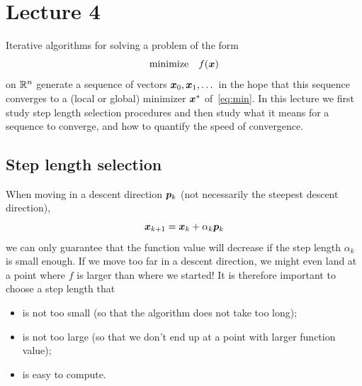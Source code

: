 %
%
% 


\chapter*{Lecture 4}
\setcounter{chapter}{4}
\setcounter{section}{0}
\setcounter{equation}{0}
\setcounter{theorem}{0}


Iterative algorithms for solving a problem of the form
\begin{equation}\label{eq:min}
 \text{minimize}\quad f(\bm{x})
\end{equation}
on $\mathbb{R}^n$ generate a sequence of vectors $\bm{x}_0,\bm{x}_1,\dots$ in the hope that this sequence converges to a (local or global) minimizer $\bm{x}^*$ of~\eqref{eq:min}. In this lecture we first study step length selection procedures and then study what it means for a sequence to converge, and how to quantify the speed of convergence.

\section{Step length selection}\label{sec:steplength}
When moving in a descent direction $\bm{p}_k$ (not necessarily the steepest descent direction), 
\begin{equation*}
  \bm{x}_{k+1} = \bm{x}_k+\alpha_k \bm{p}_k
\end{equation*}
we can only guarantee that the function value will decrease if the step length $\alpha_k$ is small enough. If we move too far in a descent direction, we might even land at a point where $f$ is larger than where we started! It is therefore important to choose a step length that 
\begin{itemize}
\item is not too small (so that the algorithm does not take too long);
\item is not too large (so that we don't end up at a point with larger function value);
\item is easy to compute.
\end{itemize} 

